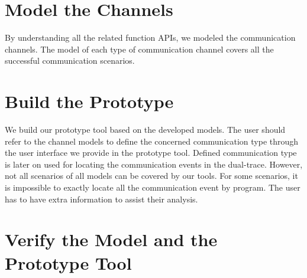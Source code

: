 \section{Model the Channels}
By understanding all the related function APIs, we modeled the communication channels. The model of each type of communication channel covers all the successful communication scenarios.
\section{Build the Prototype}
We build our prototype tool based on the developed models. The user should refer to the channel models to define the concerned communication type through the user interface we provide in the prototype tool. Defined communication type is later on used for locating the communication events in the dual-trace. However, not all scenarios of all models can be covered by our tools. For some scenarios, it is impossible to exactly locate all the communication event by program. The user has to have extra information to assist their analysis.

\section{Verify the Model and the Prototype Tool}


\setlength{\unitlength}{\savedunitlength}
